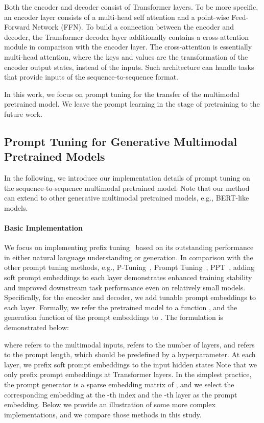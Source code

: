 \documentclass[11pt]{article}
\begin{document}
Both the encoder and decoder consist of Transformer layers. To be more specific, an encoder layer consists of a multi-head self attention and a point-wise Feed-Forward Network (FFN). 
To build a connection between the encoder and decoder, the Transformer decoder layer additionally contains a cross-attention module in comparison with the encoder layer. 
The cross-attention is essentially multi-head attention, where the keys  and values  are the transformation of the encoder output states, instead of the inputs. 
Such architecture can handle tasks that provide inputs of the sequence-to-sequence format. 






In this work, we focus on prompt tuning for the transfer of the multimodal pretrained model. We leave the prompt learning in the stage of pretraining to the future work. 

\subsection{Prompt Tuning for Generative Multimodal Pretrained Models}
In the following, we introduce our implementation details of prompt tuning on the sequence-to-sequence multimodal pretrained model. Note that our method can extend to other generative multimodal pretrained models, e.g.,  BERT-like models. 

\paragraph{Basic Implementation} We focus on implementing prefix tuning~\citep{prefix_tuning, p_tuning_v2} based on its outstanding performance in either natural language understanding or generation. 
In comparison with the other prompt tuning methods, e.g., P-Tuning~\citep{p_tuning}, Prompt Tuning~\citep{prompt_tuning}, PPT~\citep{ppt}, adding soft prompt embeddings to each layer demonstrates enhanced training stability and improved downstream task performance even on relatively small models. 
Specifically, for the encoder and decoder, we add tunable prompt embeddings to each layer. 
Formally, we refer the pretrained model to a function , and the generation function of the prompt embeddings to . 
The formulation is demonstrated below:

where  refers to the multimodal inputs,  refers to the number of layers, and  refers to the prompt length, which should be predefined by a hyperparameter. 
At each layer, we prefix soft prompt embeddings  to the input hidden states 
Note that we only prefix prompt embeddings at Transformer layers. 
In the simplest practice, the prompt generator  is a sparse embedding matrix of , and we select the corresponding embedding at the -th index and the -th layer as the prompt embedding. Below we provide an illustration of some more complex implementations, and we compare those methods in this study. 
\end{document}
